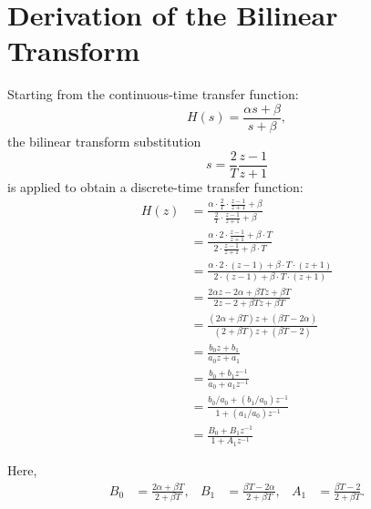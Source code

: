 \chapter{Derivation of the Bilinear Transform}
\label{app:bilinear}

Starting from the continuous-time transfer function:
\begin{equation}
  H(s) = \frac{\alpha s + \beta}{s + \beta},
\end{equation}
the bilinear transform substitution
\begin{equation}
  s = \frac{2}{T} \frac{z - 1}{z + 1}
\end{equation}
is applied to obtain a discrete-time transfer function:
\begin{align}
  H(z) &= \frac{\alpha \cdot \frac{2}{T} \cdot \frac{z-1}{z+1} + \beta}{\frac{2}{T} \cdot \frac{z-1}{z+1} + \beta} \nonumber \\
  &= \frac{\alpha \cdot 2 \cdot \frac{z-1}{z+1} + \beta \cdot T}{2 \cdot \frac{z-1}{z+1} + \beta \cdot T} \nonumber \\
  &= \frac{\alpha \cdot 2 \cdot (z-1) + \beta \cdot T \cdot (z+1)}{2 \cdot (z-1) + \beta \cdot T \cdot (z+1)} \nonumber\\
  &= \frac{2\alpha z - 2\alpha + \beta T z + \beta T}{2z - 2 + \beta T z + \beta T} \nonumber\\
  &= \frac{(2 \alpha + \beta T) z + (\beta T - 2 \alpha)}{(2 + \beta T) z + (\beta T - 2)}  \nonumber\\
  &= \frac{b_0 z + b_1}{a_0 z + a_1} \nonumber\\
  &= \frac{b_0 + b_1 z^{-1}}{a_0 + a_1 z^{-1}} \nonumber\\
  &= \frac{b_0/a_0 + (b_1/a_0) z^{-1}}{1 + (a_1/a_0) z^{-1}} \nonumber\\
  &= \frac{B_0 + B_1 z^{-1}}{1 + A_1 z^{-1}}
\end{align}

Here,
\begin{align}
  B_0 &= \frac{2\alpha + \beta T}{2 + \beta T}, &
  B_1 &= \frac{\beta T - 2\alpha}{2 + \beta T}, &
  A_1 &= \frac{\beta T - 2}{2 + \beta T}.
\end{align}



